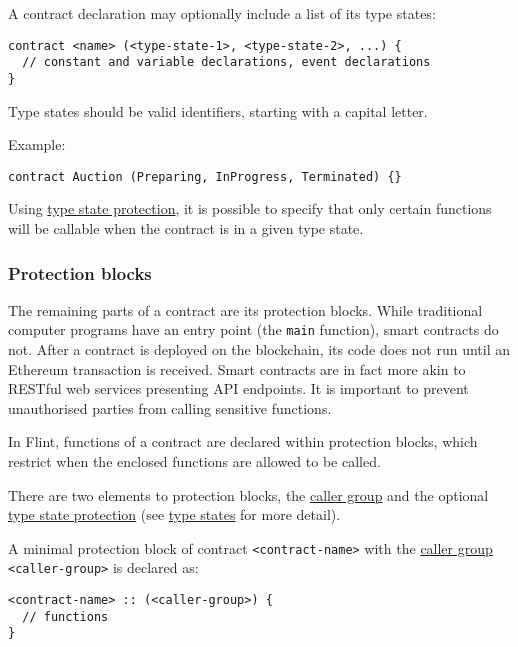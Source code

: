 A contract declaration may optionally include a list of its type states:

\begin{verbatim}
contract <name> (<type-state-1>, <type-state-2>, ...) {
  // constant and variable declarations, event declarations
}
\end{verbatim}

Type states should be valid identifiers, starting with a capital letter.

Example:

\begin{verbatim}
contract Auction (Preparing, InProgress, Terminated) {}
\end{verbatim}

Using \hyperref[sec:appendix-b-type-state-protection]{type state protection}, it is possible to specify that only certain functions will be callable when the contract is in a given type state.

\subsubsection{Protection blocks}
\label{sec:appendix-b-protection-blocks}

The remaining parts of a contract are its protection blocks. While traditional computer programs have an entry point (the \texttt{main} function), smart contracts do not. After a contract is deployed on the blockchain, its code does not run until an Ethereum transaction is received. Smart contracts are in fact more akin to RESTful web services presenting API endpoints. It is important to prevent unauthorised parties from calling sensitive functions.

In Flint, functions of a contract are declared within protection blocks, which restrict when the enclosed functions are allowed to be called.

There are two elements to protection blocks, the \hyperref[sec:appendix-b-caller-group]{caller group} and the optional \hyperref[sec:appendix-b-type-state-protection]{type state protection} (see \hyperref[sec:appendix-b-type-states]{type states} for more detail).

A minimal protection block of contract \texttt{<contract-name>} with the \hyperref[sec:appendix-b-caller-group]{caller group} \texttt{<caller-group>} is declared as:

\begin{verbatim}
<contract-name> :: (<caller-group>) {
  // functions
}
\end{verbatim}

